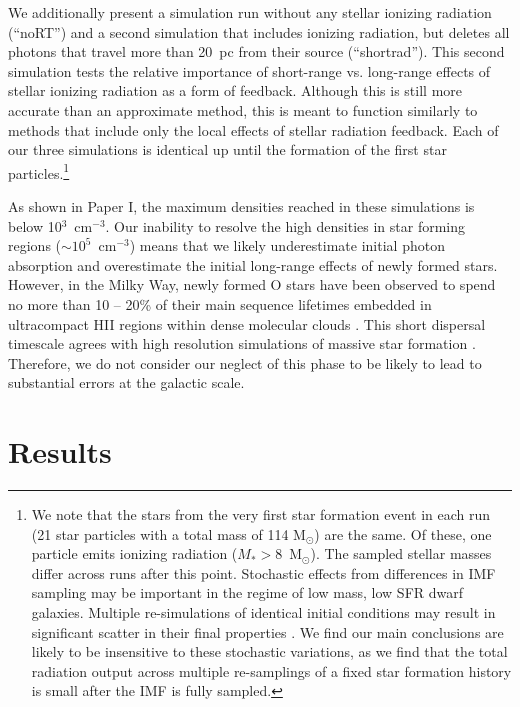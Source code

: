 We additionally present a simulation run without any stellar ionizing radiation (``noRT'') and a second simulation that includes ionizing radiation, but deletes all photons that travel more than 20~pc from their source (``shortrad''). This second simulation tests the relative importance of short-range vs. long-range effects of stellar ionizing radiation as a form of feedback. Although this is still more accurate than an approximate method, this is meant to function similarly to methods that include only the local effects of stellar radiation feedback. Each of our three simulations is identical up until the formation of the first star particles.\footnote{We note that the stars from the very first star formation event in each run (21 star particles with a total mass of 114 M$_{\odot}$) are the same. Of these, one particle emits ionizing radiation ($M_* > 8 $~M$_{\odot}$). The sampled stellar masses differ across runs after this point. Stochastic effects from differences in IMF sampling may be important in the regime of low mass, low SFR dwarf galaxies. Multiple re-simulations of identical initial conditions may result in significant scatter in their final properties \citep{Keller2018}. We find our main conclusions are likely to be insensitive to these stochastic variations, as we find that the total radiation output across multiple re-samplings of a fixed star formation history is small after the IMF is fully sampled.}

As shown in Paper I, the maximum densities reached in these simulations is below 10$^{3}$~cm$^{-3}$. Our inability to resolve the high densities in star forming regions ($\sim 10^5$~cm$^{-3}$) means that we likely underestimate initial photon absorption and overestimate the initial long-range effects of newly formed stars. However, in the Milky Way, newly formed O stars have been observed to spend no more than  10 -- 20\% of their main sequence lifetimes embedded in ultracompact HII regions within dense molecular clouds \citep{WoodChurchwell1989}. This short dispersal timescale agrees with high resolution simulations of massive star formation \citep[e.g.][]{Peters2010,Dale2014,Kim2018}. Therefore, we do not consider our neglect of this phase to be likely to lead to substantial errors at the galactic scale.

\section{Results} \label{ch2:sec:results}

